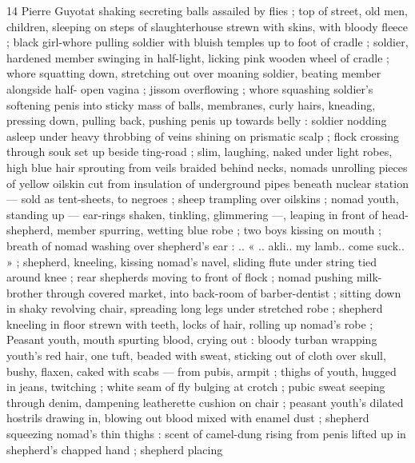 14 Pierre Guyotat
shaking secreting balls assailed by flies ; top of street, old men,
children, sleeping on steps of slaughterhouse strewn with skins, with
bloody fleece ; black girl-whore pulling soldier with bluish temples up
to foot of cradle ; soldier, hardened member swinging in half-light,
licking pink wooden wheel of cradle ; whore squatting down,
stretching out over moaning soldier, beating member alongside half-
open vagina ; jissom overflowing ; whore squashing soldier's
softening penis into sticky mass of balls, membranes, curly hairs,
kneading, pressing down, pulling back, pushing penis up towards
belly : soldier nodding asleep under heavy throbbing of veins
shining on prismatic scalp ; flock crossing through souk set up beside
ting-road ; slim, laughing, naked under light robes, high blue hair
sprouting from veils braided behind necks, nomads unrolling pieces
of yellow oilskin cut from insulation of underground pipes beneath
nuclear station — sold as tent-sheets, to negroes ; sheep trampling
over oilskins ; nomad youth, standing up — ear-rings shaken,
tinkling, glimmering —, leaping in front of head-shepherd, member
spurring, wetting blue robe ; two boys kissing on mouth ; breath of
nomad washing over shepherd's ear : .. « .. akli.. my lamb.. come
suck.. » ; shepherd, kneeling, kissing nomad's navel, sliding flute
under string tied around knee ; rear shepherds moving to front of
flock ; nomad pushing milk-brother through covered market, into
back-room of barber-dentist ; sitting down in shaky revolving chair,
spreading long legs under stretched robe ; shepherd kneeling in
floor strewn with teeth, locks of hair, rolling up nomad's robe ;
Peasant youth, mouth spurting blood, crying out : bloody turban
wrapping youth's red hair, one tuft, beaded with sweat, sticking out
of cloth over skull, bushy, flaxen, caked with scabs — from pubis,
armpit ; thighs of youth, hugged in jeans, twitching ; white seam of
fly bulging at crotch ; pubic sweat seeping through denim,
dampening leatherette cushion on chair ; peasant youth's dilated
hostrils drawing in, blowing out blood mixed with enamel dust ;
shepherd squeezing nomad's thin thighs : scent of camel-dung rising
from penis lifted up in shepherd's chapped hand ; shepherd placing


